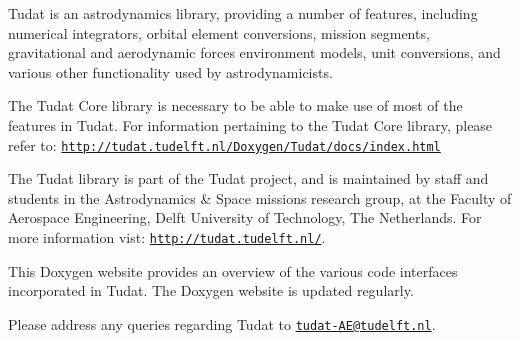 Tudat is an astrodynamics library, providing a number of features, including numerical integrators, orbital element conversions, mission segments, gravitational and aerodynamic forces environment models, unit conversions, and various other functionality used by astrodynamicists.

The Tudat Core library is necessary to be able to make use of most of the features in Tudat. For information pertaining to the Tudat Core library, please refer to\+: \href{http://tudat.tudelft.nl/Doxygen/Tudat/docs/index.html}{\tt http\+://tudat.\+tudelft.\+nl/\+Doxygen/\+Tudat/docs/index.\+html}

The Tudat library is part of the Tudat project, and is maintained by staff and students in the Astrodynamics \& Space missions research group, at the Faculty of Aerospace Engineering, Delft University of Technology, The Netherlands. For more information vist\+: \href{http://tudat.tudelft.nl/}{\tt http\+://tudat.\+tudelft.\+nl/}.

This Doxygen website provides an overview of the various code interfaces incorporated in Tudat. The Doxygen website is updated regularly.

Please address any queries regarding Tudat to \href{mailto:tudat-AE@tudelft.nl}{\tt tudat-\/\+A\+E@tudelft.\+nl}. 